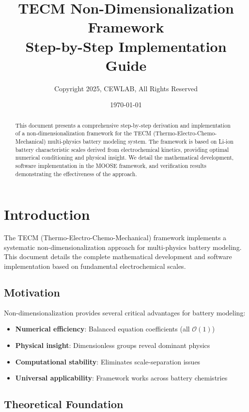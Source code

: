 \documentclass[11pt,a4paper]{article}
\title{\textbf{TECM Non-Dimensionalization Framework} \\ 
       \large Step-by-Step Implementation Guide}
\author{Copyright 2025, CEWLAB, All Rights Reserved}
\date{\today}
\begin{document}
\maketitle

\begin{abstract}
This document presents a comprehensive step-by-step derivation and implementation of a non-dimensionalization framework for the TECM (Thermo-Electro-Chemo-Mechanical) multi-physics battery modeling system. The framework is based on Li-ion battery characteristic scales derived from electrochemical kinetics, providing optimal numerical conditioning and physical insight. We detail the mathematical development, software implementation in the MOOSE framework, and verification results demonstrating the effectiveness of the approach.
\end{abstract}

\tableofcontents
\newpage

\section{Introduction}

The TECM (Thermo-Electro-Chemo-Mechanical) framework implements a systematic non-dimensionalization approach for multi-physics battery modeling. This document details the complete mathematical development and software implementation based on fundamental electrochemical scales.

\subsection{Motivation}

Non-dimensionalization provides several critical advantages for battery modeling:

\begin{itemize}
    \item \textbf{Numerical efficiency}: Balanced equation coefficients (all $\mathcal{O}(1)$)
    \item \textbf{Physical insight}: Dimensionless groups reveal dominant physics
    \item \textbf{Computational stability}: Eliminates scale-separation issues
    \item \textbf{Universal applicability}: Framework works across battery chemistries
\end{itemize}

\subsection{Theoretical Foundation}
\end{document}

